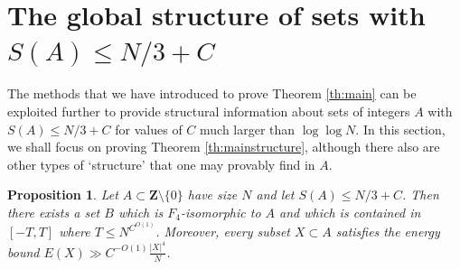 \documentclass[11pt, reqno]{amsart}
\newtheorem{proposition}[theorem]{Proposition}
\begin{document}
\section{The global structure of sets with $S(A)\leqslant N/3+C$}
The methods that we have introduced to prove Theorem \ref{th:main} can be exploited further to provide structural information about sets of integers $A$ with $S(A)\leqslant N/3+C$ for values of $C$ much larger than $\log \log N$. In this section, we shall focus on proving Theorem \ref{th:mainstructure}, although there also are other types of `structure' that one may provably find in $A$.
\begin{proposition}
    Let $A\subset\mathbf{Z}\setminus \{0\}$ have size $N$ and let $S(A)\leqslant N/3 +C$. Then there exists a set $B$ which is $F_4$-isomorphic to $A$ and which is contained in $[-T,T]$ where $T\leqslant N^{C^{O(1)}}$. Moreover, every subset $X\subset A$ satisfies the energy bound $E(X)\gg C^{-O(1)}\frac{|X|^4}{N}$.
\end{proposition}
\end{document}
